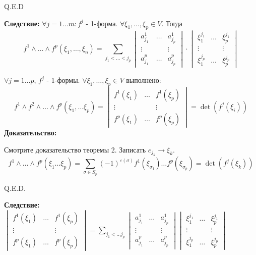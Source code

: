 \hfill Q.E.D


\textbf{Следствие:} $\forall j = 1\ldots m: f^j$ - 1-форма. $\forall \xi_1,\ldots, \xi_p \in V$. Тогда
$$f^1 \wedge \ldots \wedge f^p (\xi_1,\ldots, \xi_n) = \sum\limits_{j_1 < \ldots < j_p} \begin{vmatrix} a_{j_1}^1\ & \ldots & a_{j_p}^1 \\
\vdots & & \vdots \\
a_{j_1}^p & \ldots & a_{j_p}^{p}
\end{vmatrix}\cdot \begin{vmatrix}
\xi_1^{j_1} & \ldots & \xi_p^{j_1}\\
\vdots & & \vdots \\
\xi_{1}^{j_p} & \ldots  &  \xi_p^{j_p}
\end{vmatrix}$$

$\forall j = 1\ldots p$, $f^j$ - 1-формы. $\forall \xi_1,\ldots,\xi_p \in V$ выполнено:
$$f^1\wedge f^2 \wedge \ldots \wedge f^p(\xi_1,\ldots \xi_p) = \begin{vmatrix}
    f^1(\xi_1) & \ldots & f^1(\xi_p)\\
    \vdots & &\vdots \\
    f^p(\xi_1) &\ldots & f^p(\xi_p) 
\end{vmatrix} = \det (f^j(\xi_i))$$
\textbf{Доказательство:}

Смотрите доказательство теоремы 2. Записать $e_{j_k}\rightarrow \xi_k$.
$$f^1 \wedge \ldots \wedge f^p(\xi_1\ldots \xi_p) = \sum\limits_{\sigma \in S_p}(-1)^{\varepsilon(\sigma)} f^1(\xi_{\sigma_1})\ldots f^p(\xi_{\sigma_p}) = \det(f^{j}(\xi_k)) $$

\hfill Q.E.D.

\textbf{Следствие:} $\begin{vmatrix}
f^1(\xi_1) & \ldots & f^1(\xi_p)\\
\vdots & & \vdots \\
f^p(\xi_1) & \ldots & f^p(\xi_p)
\end{vmatrix} = \sum\limits_{j_1 < \ldots j_p} \begin{vmatrix}
    a_{j_1}^1 & \ldots & a^1_{j_p}\\
    \vdots & & \vdots \\
    a_{j_1}^p & \ldots & a_{j_{p}}^p 
\end{vmatrix} \begin{vmatrix}
    \xi^{j_1}_{1} & \ldots & \xi_{p}^{j_1} \\
    \vdots & & \vdots \\
    \xi_{1}^{j_p} & \ldots & \xi_{p}^{j_p}
\end{vmatrix}$ 

